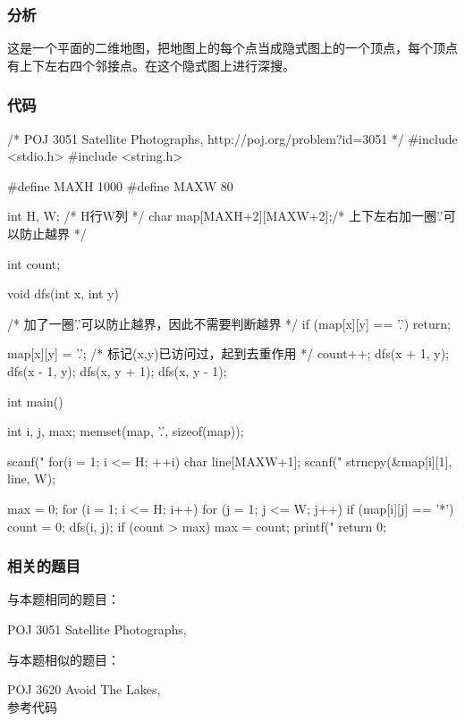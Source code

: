 \subsubsection{分析}
这是一个平面的二维地图，把地图上的每个点当成隐式图上的一个顶点，每个顶点有上下左右四个邻接点。在这个隐式图上进行深搜。


\subsubsection{代码}
\begin{Codex}[label=satellite_photographs.c]
/* POJ 3051 Satellite Photographs, http://poj.org/problem?id=3051 */
#include <stdio.h>
#include <string.h>

#define MAXH 1000
#define MAXW 80

int H, W; /* H行W列 */
char map[MAXH+2][MAXW+2];/* 上下左右加一圈'.'可以防止越界 */

int count;

void dfs(int x, int y) {
    /* 加了一圈'.'可以防止越界，因此不需要判断越界 */
    if (map[x][y] == '.') return;

    map[x][y] = '.';  /* 标记(x,y)已访问过，起到去重作用 */
    count++;
    dfs(x + 1, y);
    dfs(x - 1, y);
    dfs(x, y + 1);
    dfs(x, y - 1);
}

int main() {
    int i, j, max;
    memset(map, '.', sizeof(map));

    scanf("%
    for(i = 1; i <= H; ++i) {
        char line[MAXW+1];
        scanf("%
        strncpy(&map[i][1], line, W);
    }

    max = 0;
    for (i = 1; i <= H; i++) {
        for (j = 1; j <= W; j++) {
            if (map[i][j] == '*') {
                count = 0;
                dfs(i, j);
            }
            if (count > max) max = count;
        }
    }
    printf("%
    return 0;
}
\end{Codex}


\subsubsection{相关的题目}
与本题相同的题目：
\begindot
\item POJ 3051 Satellite Photographs, 
\myenddot

与本题相似的题目：
\begindot
\item POJ 3620 Avoid The Lakes,  \\ 参考代码 
\myenddot


